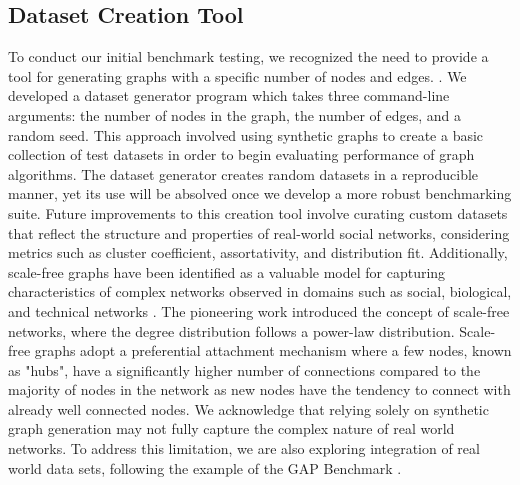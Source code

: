 \documentclass[letterpaper, 10pt]{article}
\begin{document}
\begin{multicols}{2}
{    \section{Dataset Creation Tool}\label{section:datasetCreation}
        To conduct our initial benchmark testing, we recognized the need to provide a tool for generating graphs with a specific number of nodes and edges.
         . We developed a dataset generator program which takes three command-line arguments: the number of nodes in the graph, the number of edges, and a random seed. This approach involved using synthetic graphs to create a basic collection of test datasets in order to begin evaluating performance of graph algorithms.  The dataset generator creates random datasets in a reproducible manner, yet its use will be absolved once we develop a more robust benchmarking suite. Future improvements to this creation tool involve curating custom datasets that reflect the structure and properties of real-world social networks, considering metrics such as cluster coefficient, assortativity, and distribution fit. 
        Additionally, scale-free graphs have been identified as a valuable model for capturing characteristics of complex networks observed in domains such as social, biological, and technical networks \cite{Newman2003}. The pioneering work introduced the concept of scale-free networks, where the degree distribution follows a power-law distribution. Scale-free graphs adopt a preferential attachment mechanism \cite{Rak2020}where a few nodes, known as "hubs", have a significantly higher number of connections compared to the majority of nodes in the network as new nodes have the tendency to connect with already well connected nodes. We acknowledge that relying solely on synthetic graph generation may not fully capture the complex nature of real world networks. To address this limitation, we are also exploring integration of real world data sets, following the example of the GAP Benchmark \cite{Beamer2017}.
        
}
\end{multicols}
\end{document}
